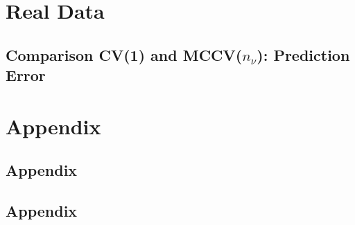 \documentclass[12pt,a4paper]{article}
\newcommand{\RM}[1]{\MakeUppercase{\romannumeral #1{}}}
\begin{document}

	
	
\renewcommand{\contentsname}{Table of Contents}
\newpage 								
\tableofcontents	
					      



\newpage

		




	



\section{Real Data}

\subsection{Comparison CV(1) and MCCV($n_{\nu}$): Prediction Error}




	
\newpage
{} 		      %
\setcounter{page}{1}			  %
\section*{Appendix}
\subsection*{Appendix \RM{1}}

\subsection*{Appendix \RM{2}}



\begin{lstlisting}[title={Algorithmus:~$m+1=6$ und $n=200$}]

\end{lstlisting}

\end{document}
